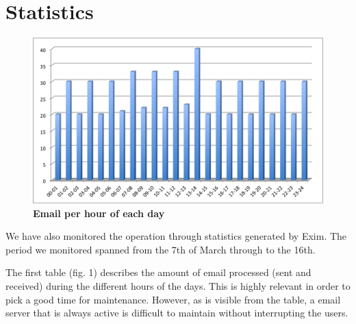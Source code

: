 \section{Statistics}

\begin{figure}
  \vspace{-30pt}
  \begin{center}
    \includegraphics[scale=0.5]{img/per-hour.png}
  \end{center}
  \vspace{-20pt}
  \caption{\bf{Email per hour of each day}}
  \hspace*{20pt}
\end{figure}

We have also monitored the operation through statistics generated by Exim. The period we monitored spanned from the 7th of March through to the 16th.\newline


The first table (fig. 1) describes the amount of email processed (sent and received) during the different hours of the days. This is highly relevant in order to pick a good time for maintenance. However, as is visible from the table, a email server that is always active is difficult to maintain without interrupting the users.\newline

